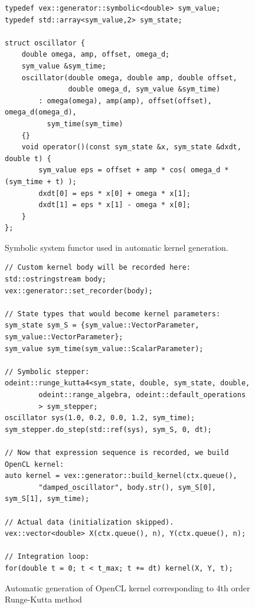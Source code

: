 \documentclass[1p]{elsarticle}
\begin{document}
\begin{figure}[p]
\begin{lstlisting}
typedef vex::generator::symbolic<double> sym_value;
typedef std::array<sym_value,2> sym_state;

struct oscillator {
    double omega, amp, offset, omega_d;
    sym_value &sym_time;
    oscillator(double omega, double amp, double offset,
               double omega_d, sym_value &sym_time)
        : omega(omega), amp(amp), offset(offset), omega_d(omega_d),
          sym_time(sym_time)
    {}
    void operator()(const sym_state &x, sym_state &dxdt, double t) {
        sym_value eps = offset + amp * cos( omega_d * (sym_time + t) );
        dxdt[0] = eps * x[0] + omega * x[1];
        dxdt[1] = eps * x[1] - omega * x[0];
    }
};
\end{lstlisting}
\caption{Symbolic system functor used in automatic kernel generation.}
\label{code:symsysfunc}
\end{figure}

\begin{figure}[p]
\begin{lstlisting}
// Custom kernel body will be recorded here:
std::ostringstream body;
vex::generator::set_recorder(body);

// State types that would become kernel parameters:
sym_state sym_S = {sym_value::VectorParameter, sym_value::VectorParameter};
sym_value sym_time(sym_value::ScalarParameter);

// Symbolic stepper:
odeint::runge_kutta4<sym_state, double, sym_state, double,
        odeint::range_algebra, odeint::default_operations
        > sym_stepper;
oscillator sys(1.0, 0.2, 0.0, 1.2, sym_time);
sym_stepper.do_step(std::ref(sys), sym_S, 0, dt);

// Now that expression sequence is recorded, we build OpenCL kernel:
auto kernel = vex::generator::build_kernel(ctx.queue(),
        "damped_oscillator", body.str(), sym_S[0], sym_S[1], sym_time);

// Actual data (initialization skipped).
vex::vector<double> X(ctx.queue(), n), Y(ctx.queue(), n);

// Integration loop:
for(double t = 0; t < t_max; t += dt) kernel(X, Y, t);
\end{lstlisting}
\caption{Automatic generation of OpenCL kernel corresponding to 4th order
Runge-Kutta method}
\label{code:krnbuilder}
\end{figure}
\end{document}
